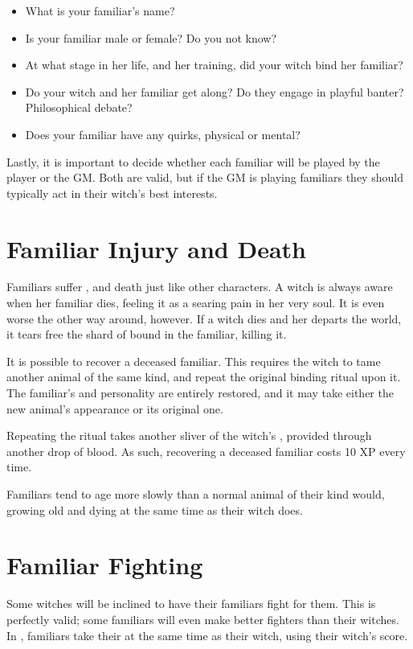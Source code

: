 \begin{itemize}
	\item What is your familiar's name?
	\item Is your familiar male or female?
		Do you not know?
	\item At what stage in her life, and her training, did your witch bind her familiar?
	\item Do your witch and her familiar get along?
		Do they engage in playful banter?
		Philosophical debate?
	\item Does your familiar have any quirks, physical or mental?
\end{itemize}

Lastly, it is important to decide whether each familiar will be played by the player or the GM.
Both are valid, but if the GM is playing familiars they should typically act in their witch's best interests.

\section{Familiar Injury and Death}

Familiars suffer {\damage}, {\shock} and death just like other characters.
A witch is always aware when her familiar dies, feeling it as a searing pain in her very soul.
It is even worse the other way around, however.
If a witch dies and her {\soul} departs the world, it tears free the shard of {\soul} bound in the familiar, killing it.

It is possible to recover a deceased familiar.
This requires the witch to tame another animal of the same kind, and repeat the original binding ritual upon it.
The familiar's {\soul} and personality are entirely restored, and it may take either the new animal's appearance or its original one.

Repeating the ritual takes another sliver of the witch's {\soul}, provided through another drop of blood.
As such, recovering a deceased familiar costs 10 XP every time.

Familiars tend to age more slowly than a normal animal of their kind would, growing old and dying at the same time as their witch does.

\section{Familiar Fighting}

Some witches will be inclined to have their familiars fight for them.
This is perfectly valid; some familiars will even make better fighters than their witches.
In {\structuredtime}, familiars take their {\turn} at the same time as their witch, using their witch's {\initiative} score.


